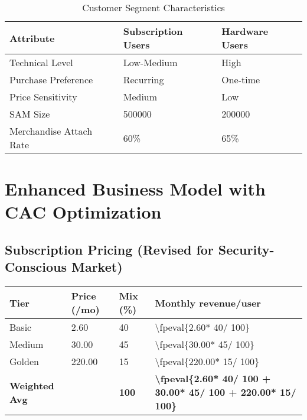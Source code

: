 \documentclass[11pt]{article}
\newcommand{\numfpeval}[1]{\num{\fpeval{#1}}}
\newcommand{\subBasicPrice}{2.60}
\newcommand{\subBasicMix}{40}
\newcommand{\subMediumPrice}{30.00}
\newcommand{\subMediumMix}{45}
\newcommand{\subGoldenPrice}{220.00}
\newcommand{\subGoldenMix}{15}
\newcommand{\merchAttachRate}{60}
\newcommand{\samSubs}{500000}
\newcommand{\samHw}{200000}
\begin{document}
\begin{table}[H]
\centering
\caption{Customer Segment Characteristics}
\begin{tabularx}{\linewidth}{l X X}
\toprule
Attribute & Subscription Users & Hardware Users \\\midrule
Technical Level & Low-Medium & High \\
Purchase Preference & Recurring & One-time \\
Price Sensitivity & Medium & Low \\
SAM Size & \samSubs\cite{chainalysis2024,triple2023} & \samHw\cite{chainalysis2024,triple2023} \\
Merchandise Attach Rate & \merchAttachRate\%\cite{shopify2024} & 65\%\cite{shopify2024} \\
\bottomrule
\end{tabularx}
\end{table}

\section{Enhanced Business Model with CAC Optimization}

\subsection{Subscription Pricing (Revised for Security-Conscious Market)}
\begin{table}[H]
\centering
\begin{tabularx}{\linewidth}{l Y Y Y}
\toprule
Tier & Price (/mo) & Mix (\%) & Monthly revenue/user \\\midrule
Basic   & \num{\subBasicPrice}  & \num{\subBasicMix} & \numfpeval{\subBasicPrice * \subBasicMix / 100} \\
Medium  & \num{\subMediumPrice} & \num{\subMediumMix} & \numfpeval{\subMediumPrice * \subMediumMix / 100} \\
Golden  & \num{\subGoldenPrice} & \num{\subGoldenMix} & \numfpeval{\subGoldenPrice * \subGoldenMix / 100} \\\midrule
\textbf{Weighted Avg} &  & \textbf{\num{100}} & \textbf{\numfpeval{\subBasicPrice * \subBasicMix / 100 + \subMediumPrice * \subMediumMix / 100 + \subGoldenPrice * \subGoldenMix / 100}} \\
\bottomrule
\end{tabularx}
\end{table}
\end{document}
